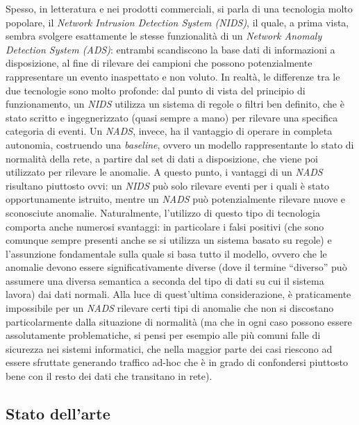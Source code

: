 \documentclass[12pt,a4paper,cucitura]{toptesi}
\begin{document}
Spesso, in letteratura e nei prodotti commerciali, si parla di una tecnologia molto popolare, il \emph{Network Intrusion Detection System (NIDS)}, il quale, a prima vista, sembra svolgere esattamente le stesse funzionalità di un \emph{Network Anomaly Detection System (ADS)}: entrambi scandiscono la base dati di informazioni a disposizione, al fine di rilevare dei campioni che possono potenzialmente rappresentare un evento inaspettato e non voluto.
In realtà, le differenze tra le due tecnologie sono molto profonde: dal punto di vista del principio di funzionamento, un \emph{NIDS} utilizza un sistema di regole o filtri ben definito, che è stato scritto e ingegnerizzato (quasi sempre a mano) per rilevare una specifica categoria di eventi.
Un \emph{NADS}, invece, ha il vantaggio di operare in completa autonomia, costruendo una \emph{baseline}, ovvero un modello rappresentante lo stato di normalità della rete, a partire dal set di dati a disposizione, che viene poi utilizzato per rilevare le anomalie.
A questo punto, i vantaggi di un \emph{NADS} risultano piuttosto ovvi: un \emph{NIDS} può solo rilevare eventi per i quali è stato opportunamente istruito, mentre un \emph{NADS} può potenzialmente rilevare nuove e sconosciute anomalie.
Naturalmente, l'utilizzo di questo tipo di tecnologia comporta anche numerosi svantaggi: in particolare i falsi positivi (che sono comunque sempre presenti anche se si utilizza un sistema basato su regole) e l'assunzione fondamentale sulla quale si basa tutto il modello, ovvero che le anomalie devono essere significativamente diverse (dove il termine ``diverso'' può assumere una diversa semantica a seconda del tipo di dati su cui il sistema lavora) dai dati normali.
Alla luce di quest'ultima considerazione, è praticamente impossibile per un \emph{NADS} rilevare certi tipi di anomalie che non si discostano particolarmente dalla situazione di normalità (ma che in ogni caso possono essere assolutamente problematiche, si pensi per esempio alle più comuni falle di sicurezza nei sistemi informatici, che nella maggior parte dei casi riescono ad essere sfruttate generando traffico ad-hoc che è in grado di confondersi piuttosto bene con il resto dei dati che transitano in rete).  

\subsection{Stato dell'arte}
\end{document}
